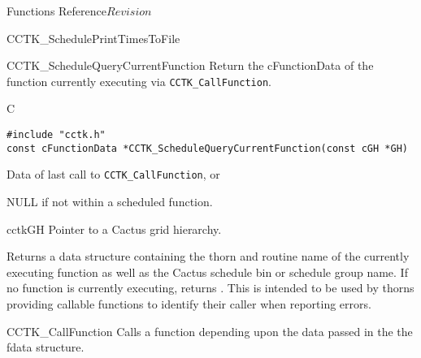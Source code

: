\begin{cactuspart}{ Functions Reference}{}{$Revision$}
\begin{FunctionDescription}{CCTK\_SchedulePrintTimesToFile}
\end{FunctionDescription}



\begin{FunctionDescription}{CCTK\_ScheduleQueryCurrentFunction}
  \label{CCTK-ScheduleQueryCurrentFunction}
   Return the cFunctionData of the function currently executing via
   \texttt{CCTK\_CallFunction}.
  
  \begin{SynopsisSection}
    \begin{Synopsis}{C}
\begin{verbatim}
#include "cctk.h"
const cFunctionData *CCTK_ScheduleQueryCurrentFunction(const cGH *GH)
\end{verbatim}
    \end{Synopsis}
  \end{SynopsisSection}
  
  \begin{ResultSection}
    \begin{ResultNote}
      Data of last call to \texttt{CCTK\_CallFunction}, or
    \end{ResultNote}
    \begin{Result}{NULL}
      if not within a scheduled function.
    \end{Result}
  \end{ResultSection}
  
  \begin{ParameterSection}
    \begin{Parameter}{cctkGH}
      Pointer to a Cactus grid hierarchy.
    \end{Parameter}
  \end{ParameterSection}
  
  \begin{Discussion}
    Returns a data structure containing the thorn and routine name of the
    currently executing function as well as the Cactus schedule bin or schedule group name. If no
    function is currently executing, returns . This is intended to
    be used by thorns providing callable functions to identify their caller
    when reporting errors.
  \end{Discussion}
  
  \begin{SeeAlsoSection}
    \begin{SeeAlso}{CCTK\_CallFunction}
      Calls a function depending upon the data passed in the the fdata
      structure.
    \end{SeeAlso}
  \end{SeeAlsoSection}


\end{FunctionDescription}
\end{cactuspart}
